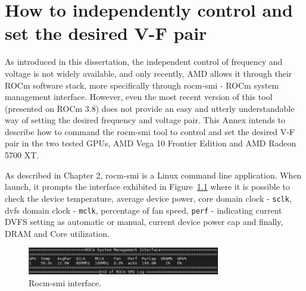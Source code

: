 
\chapter{How to independently control and set the desired V-F pair}
\label{chapter:appendixRocm-smi}

As introduced in this dissertation, the independent control of frequency and voltage is not widely available, and only recently, AMD allows it through their ROCm software stack, more specifically through rocm-smi - ROCm system management interface. However, even the most recent version of this tool (presented on ROCm 3.8) does not provide an easy and utterly understandable way of setting the desired frequency and voltage pair. This Annex intends to describe how to command the rocm-smi tool to control and set the desired V-F pair in the two tested GPUs, AMD Vega 10 Frontier Edition and AMD Radeon 5700 XT.

As described in Chapter 2, rocm-smi is a Linux command line application. When launch, it prompts the interface exhibited in Figure~\ref{fig:rocm-smi} where it is possible to check the device temperature, average device power, core domain clock - \texttt{sclk}, \acrshort{dvfs} domain clock - \texttt{mclk}, percentage of fan speed, \texttt{perf} - indicating current DVFS setting as automatic or manual, current device power cap and finally, DRAM and Core utilization.

\begin{figure}[htb]
    \centering
\includegraphics[width=0.75\textwidth]{Figures/AnnexA/rocm-smi.png}
        \caption{Rocm-smi interface.}
    \label{fig:rocm-smi}
\end{figure}


